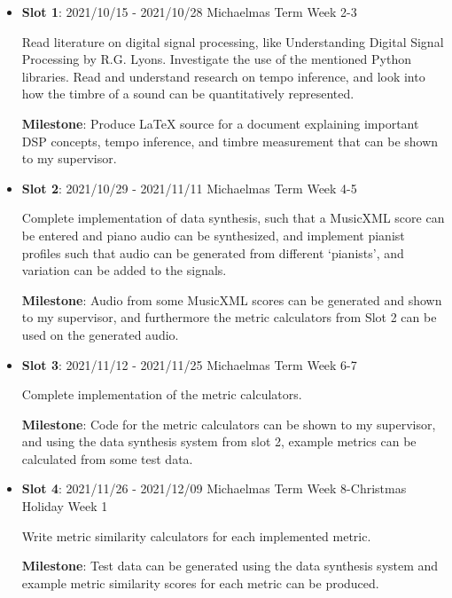 \documentclass[12pt]{article}
\begin{document}
\begin{itemize}
    
  \item \textbf{Slot 1}: 2021/10/15 - 2021/10/28 \hspace*{\fill}Michaelmas Term Week 2-3

Read literature on digital signal processing, like Understanding Digital Signal Processing by R.G. Lyons. Investigate the use of the mentioned Python libraries. Read and understand research on tempo inference, and look into how the timbre of a sound can be quantitatively represented.

\textbf{Milestone}: Produce LaTeX source for a document explaining important DSP concepts, tempo inference, and timbre measurement that can be shown to my supervisor.

\item
  \textbf{Slot 2}: 2021/10/29 - 2021/11/11 \hspace*{\fill} Michaelmas Term Week 4-5

Complete implementation of data synthesis, such that a MusicXML score can be entered and piano audio can be synthesized, and implement pianist profiles such that audio can be generated from different ‘pianists’, and variation can be added to the signals.

\textbf{Milestone}: Audio from some MusicXML scores can be generated and shown to my supervisor, and furthermore the metric calculators from Slot 2 can be used on the generated audio.

\item
  \textbf{Slot 3}: 2021/11/12 - 2021/11/25 \hspace*{\fill}Michaelmas Term Week 6-7

Complete implementation of the metric calculators.

\textbf{Milestone}: Code for the metric calculators can be shown to my supervisor, and using the data synthesis system from slot 2, example metrics can be calculated from some test data.

\item
  \textbf{Slot 4}: 2021/11/26 - 2021/12/09 \hspace*{\fill}Michaelmas Term Week 8-Christmas Holiday Week 1

Write metric similarity calculators for each implemented metric.

\textbf{Milestone}: Test data can be generated using the data synthesis system and example metric similarity scores for each metric can be produced.


\end{itemize}
\end{document}
